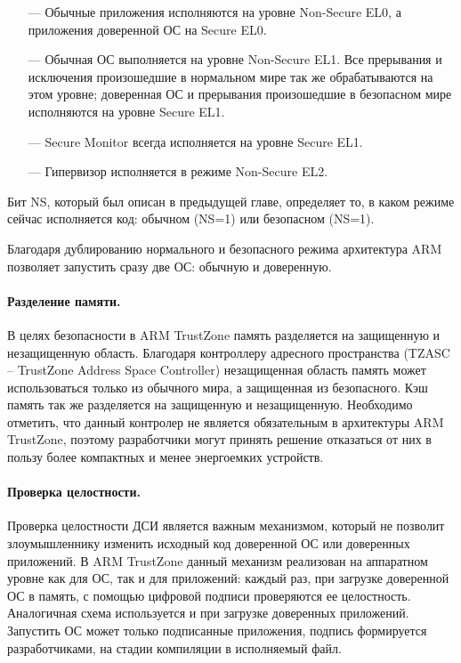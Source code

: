 \begin{itemize}
	\item [---] Обычные приложения исполняются на уровне Non-Secure EL0, а приложения доверенной ОС на Secure EL0.
	\item [---] Обычная ОС выполняется на уровне Non-Secure EL1. Все прерывания и исключения произошедшие в нормальном мире так же обрабатываются на этом уровне; доверенная ОС и прерывания произошедшие в безопасном мире исполняются на уровне Secure EL1.
	\item [---] Secure Monitor всегда исполняется на уровне Secure EL1.
	\item [---] Гипервизор исполняется в режиме Non-Secure EL2.
\end{itemize}

Бит NS, который был описан в предыдущей главе, определяет то, в каком режиме сейчас исполняется код: обычном (NS=1) или безопасном (NS=1).

Благодаря дублированию нормального и безопасного режима архитектура ARM позволяет запустить сразу две ОС: обычную и доверенную.

\paragraph{Разделение памяти.}

В целях безопасности в ARM TrustZone память разделяется на защищенную и незащищенную область. Благодаря контроллеру адресного пространства (TZASC -- TrustZone Address Space Controller) незащищенная область память может использоваться только из обычного мира, а защищенная из безопасного. Кэш память так же разделяется на защищенную и незащищенную. Необходимо отметить, что данный контролер не является обязательным в архитектуры ARM TrustZone, поэтому разработчики могут принять решение отказаться от них в пользу более компактных и менее энергоемких устройств.

\paragraph{Проверка целостности.}

Проверка целостности ДСИ является важным механизмом, который не позволит злоумышленнику изменить исходный код доверенной ОС или доверенных приложений. В ARM TrustZone данный механизм реализован на аппаратном уровне как для ОС, так и для приложений: каждый раз, при загрузке доверенной ОС в память, с помощью цифровой подписи проверяются ее целостность. Аналогичная схема используется и при загрузке доверенных приложений. Запустить ОС может только подписанные приложения, подпись формируется разработчиками, на стадии компиляции в исполняемый файл.

